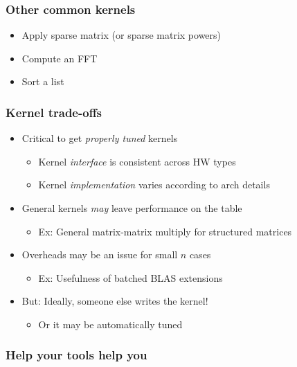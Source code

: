 \documentclass{beamer}
\begin{document}
\begin{frame}
  \frametitle{Other common kernels}

  \begin{itemize}
  \item Apply sparse matrix (or sparse matrix powers)
  \item Compute an FFT
  \item Sort a list
  \end{itemize}
\end{frame}


\begin{frame}
  \frametitle{Kernel trade-offs}

  \begin{itemize}
  \item Critical to get {\em properly tuned} kernels
    \begin{itemize}
    \item Kernel {\em interface} is consistent across HW types
    \item Kernel {\em implementation} varies according to arch details
    \end{itemize}
  \item General kernels {\em may} leave performance on the table
    \begin{itemize}
    \item Ex: General matrix-matrix multiply for structured matrices
    \end{itemize}
  \item Overheads may be an issue for small $n$ cases
    \begin{itemize}
    \item Ex: Usefulness of batched BLAS extensions
    \end{itemize}
  \item But: Ideally, someone else writes the kernel!
    \begin{itemize}
    \item Or it may be automatically tuned
    \end{itemize}
  \end{itemize}
\end{frame}




\begin{frame}
  \frametitle{Help your tools help you}
\end{frame}
\end{document}

